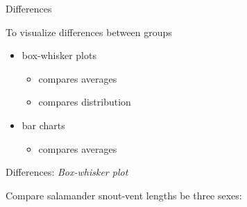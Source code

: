 \documentclass[ignorenonframetext,t]{beamer}
\newenvironment{Shaded}{\begin{snugshade}}{\end{snugshade}}
\newcommand{\KeywordTok}[1]{\textcolor[rgb]{0.13,0.29,0.53}{\textbf{#1}}}
\newcommand{\StringTok}[1]{\textcolor[rgb]{0.31,0.60,0.02}{#1}}
\newcommand{\CommentTok}[1]{\textcolor[rgb]{0.56,0.35,0.01}{\textit{#1}}}
\newcommand{\OperatorTok}[1]{\textcolor[rgb]{0.81,0.36,0.00}{\textbf{#1}}}
\newcommand{\NormalTok}[1]{#1}
\providecommand{\tightlist}{%
  \setlength{\itemsep}{0pt}\setlength{\parskip}{0pt}}
\begin{document}
\begin{frame}{Differences}

To visualize differences between groups

\begin{itemize}
\tightlist
\item
  box-whisker plots

  \begin{itemize}
  \tightlist
  \item
    compares averages
  \item
    compares distribution
  \end{itemize}
\item
  bar charts

  \begin{itemize}
  \tightlist
  \item
    compares averages
  \end{itemize}
\end{itemize}

\end{frame}

\begin{frame}[fragile]{Differences: \emph{Box-whisker plot}}

Compare salamander snout-vent lengths be three sexes:

\begin{Shaded}
\end{Shaded}


\end{frame}
\end{document}
